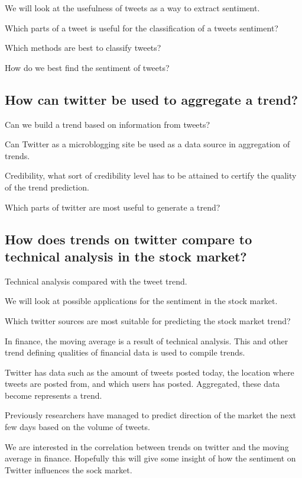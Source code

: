 We will look at the usefulness of tweets as a way to extract sentiment. 

Which parts of a tweet is useful for the classification of a tweets sentiment?

Which methods are best to classify tweets? 

How do we best find the sentiment of tweets?

\subsection{How can twitter be used to aggregate a trend?\\}
Can we build a trend based on information from tweets? 
 
Can Twitter as a microblogging site be used as a data source in aggregation of trends.

Credibility, what sort of credibility level has to be attained to certify the
quality of the trend prediction. 

Which parts of twitter are most useful to generate a trend?

\subsection{How does trends on twitter compare to technical analysis in the
stock market?\\}
Technical analysis compared with the tweet trend.

We will look at possible applications for the sentiment in the stock market.

Which twitter sources are most suitable for predicting the stock market
trend?

In finance, the moving average is a result of technical analysis. This and
other trend defining qualities of financial data is used to compile trends. 

Twitter has data such as the amount of tweets posted today, the location where
tweets are posted from, and which users has posted. Aggregated, these data
become represents a trend.  

Previously researchers have managed to predict direction of the market the
next few days based on the volume of tweets. 

We are interested in the correlation between trends on twitter and the moving
average in finance. Hopefully this will give some insight of how the sentiment on
Twitter influences the sock market.  

